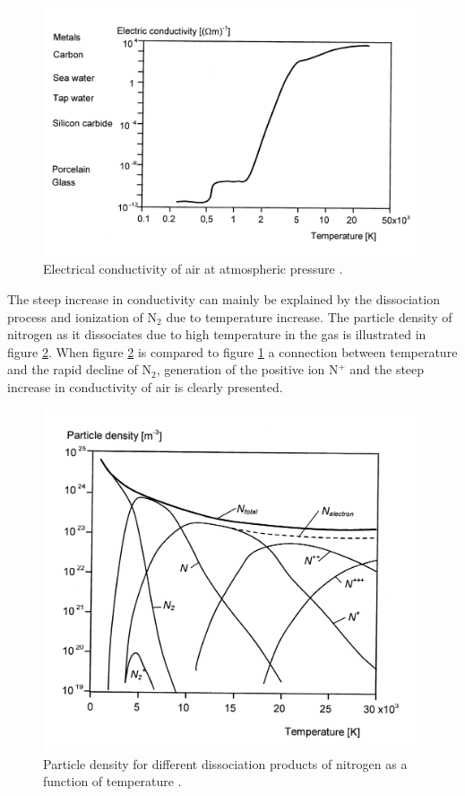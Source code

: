 \documentclass[10pt,a4paper]{article} %
\begin{document}
\begin{figure}[H]
\centering
\includegraphics[scale=0.8]{Bilder/Theory/airConduct.png}
\caption{Electrical conductivity of air at atmospheric pressure \cite{bib:HVEbreak}.} \label{fig:condAir}
\end{figure}

The steep increase in conductivity can mainly be explained by the dissociation process and ionization of N$_2$ due to temperature increase. The particle density of nitrogen as it dissociates due to high temperature in the gas is illustrated in figure \ref{fig:Ndensi}. When figure \ref{fig:Ndensi} is compared to figure \ref{fig:condAir} a connection between temperature and the rapid decline of N$_2$, generation of the positive ion N$^+$ and the steep increase in conductivity of air is clearly presented.

\begin{figure}[H]
\centering
\includegraphics[scale=0.8]{Bilder/Theory/particleDensNit.png}
\caption{Particle density for different dissociation products of nitrogen as a function of temperature \cite{bib:HVEbreak}.} \label{fig:Ndensi}
\end{figure}
\end{document}
